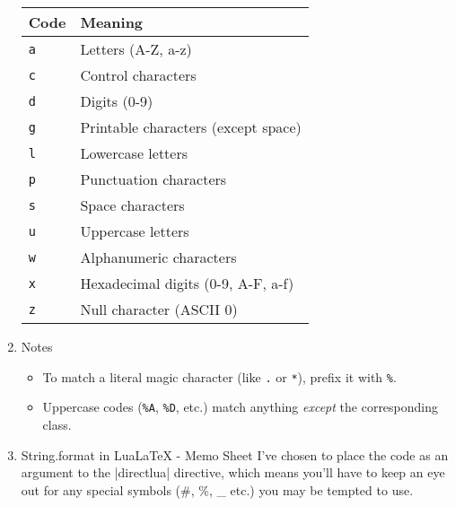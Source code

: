 \begin{enumerate}[label=(\alph*)]
\begin{center}
  \begin{tabular}{@{}ll@{}}
  \toprule
  \textbf{Code} & \textbf{Meaning} \\
  \midrule
  \texttt{a} & Letters (A-Z, a-z) \\
  \texttt{c} & Control characters \\
  \texttt{d} & Digits (0-9) \\
  \texttt{g} & Printable characters (except space) \\
  \texttt{l} & Lowercase letters \\
  \texttt{p} & Punctuation characters \\
  \texttt{s} & Space characters \\
  \texttt{u} & Uppercase letters \\
  \texttt{w} & Alphanumeric characters \\
  \texttt{x} & Hexadecimal digits (0-9, A-F, a-f) \\
  \texttt{z} & Null character (ASCII 0) \\
  \bottomrule
  \end{tabular}
\end{center}



\item Notes
\begin{itemize}
    \item To match a literal magic character (like \texttt{.} or \texttt{*}), prefix it with \texttt{\%}.
    \item Uppercase codes (\texttt{\%A}, \texttt{\%D}, etc.) match anything \emph{except} the corresponding class.
\end{itemize}

\item String.format in LuaLaTeX - Memo Sheet
I've chosen to place the code  as an argument to the |directlua| directive, which means you'll have to keep an eye out for any special symbols (\#, \%, \_ etc.) you may be tempted to use.


\end{enumerate}

